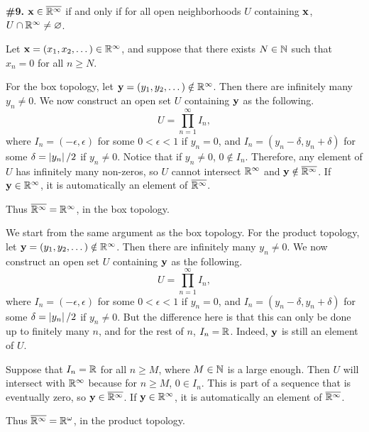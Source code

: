 \documentclass[a4paper,11pt]{article}
\begin{document}
\newpage

\phantom{?}
\vspace{5mm}

\begin{minipage}[t][270mm]{90mm}
    {\bfseries \large \#9.} \(\bf{x} \in \cl{\R^\infty}\) if and only if for all open neighborhoods \(U\) containing \(\bf{x}\), \(U \cap \R^\infty \neq \varnothing\).

    Let \(\bf{x} = (x_1, x_2, \dots) \in \R^\infty\), and suppose that there exists \(N \in \N\) such that \(x_n = 0\) for all \(n \geq N\).

    \bigskip

    For the box topology, let \(\bf{y} = (y_1, y_2, \dots) \notin \R^\infty\). Then there are infinitely many \(y_n \neq 0\). We now construct an open set \(U\) containing \(\bf{y}\) as the following.
    \[
        U = \prod_{n=1}^\infty I_n,
    \]
    where \(I_n = (-\epsilon, \epsilon)\) for some \(0 < \epsilon < 1\) if \(y_n = 0\), and \(I_n = (y_n - \delta, y_n + \delta)\) for some \(\delta = \abs{y_n} / 2\) if \(y_n \neq 0\). Notice that if \(y_n \neq 0\), \(0 \notin I_n\). Therefore, any element of \(U\) has infinitely many non-zeros, so \(U\) cannot intersect \(\R^\infty\) and \(\bf{y} \notin \cl{\R^\infty}\). If \(\bf{y} \in \R^\infty\), it is automatically an element of \(\cl{\R^\infty}\).

    Thus \(\cl{\R^\infty} = \R^\infty\), in the box topology.

    \bigskip

    We start from the same argument as the box topology. For the product topology, let \(\bf{y} = (y_1, y_2, \dots) \notin \R^\infty\). Then there are infinitely many \(y_n \neq 0\). We now construct an open set \(U\) containing \(\bf{y}\) as the following.
    \[
        U = \prod_{n=1}^\infty I_n,
    \]
    where \(I_n = (-\epsilon, \epsilon)\) for some \(0 < \epsilon < 1\) if \(y_n = 0\), and \(I_n = (y_n - \delta, y_n + \delta)\) for some \(\delta = \abs{y_n} / 2\) if \(y_n \neq 0\). But the difference here is that this can only be done up to finitely many \(n\), and for the rest of \(n\), \(I_n = \R\). Indeed, \(\bf{y}\) is still an element of \(U\).

    Suppose that \(I_n = \R\) for all \(n \geq M\), where \(M \in \N\) is a large enough. Then \(U\) will intersect with \(\R^\infty\) because for \(n \geq M\), \(0 \in I_n\). This is part of a sequence that is eventually zero, so \(\bf{y} \in \cl{\R^\infty}\). If \(\bf{y} \in \R^\infty\), it is automatically an element of \(\cl{\R^\infty}\).

    Thus \(\cl{\R^\infty} = \R^\omega\), in the product topology.
\end{minipage}
{\color{gray}\vline}
\begin{minipage}[t][270mm]{90mm}
    \phantom{?}
\end{minipage}
\end{document}

